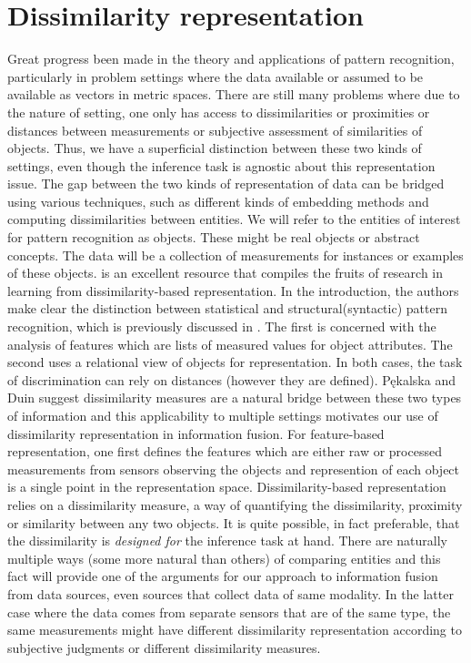 \documentclass[12pt,oneside,final]{thesis}\usepackage[]{graphicx}\usepackage[]{color}
\begin{document}
\section{Dissimilarity representation}
 Great progress been made in the theory and applications of pattern recognition, particularly in problem settings where the data available or assumed to be available as vectors in metric spaces. There are still many problems where due to the nature of setting, one only has access to dissimilarities or  proximities or distances between measurements or subjective assessment  of similarities of objects. Thus, we have a superficial distinction between these two kinds of settings, even though the inference task is agnostic about this representation issue. The gap between the two kinds of representation of data can be bridged using various  techniques, such as different kinds of embedding methods and computing dissimilarities between entities.
We will refer to the entities of interest for pattern recognition as objects. These might be real objects or abstract concepts. The data will be a collection of measurements for instances or examples of these objects.
 \cite{duin2005dissimilarity} is an excellent resource that compiles the fruits of research in learning from  dissimilarity-based representation. In the introduction, the authors make clear the distinction between statistical and structural(syntactic) pattern recognition, which is previously discussed in \cite{NadlerSmith1993}. The first is concerned with the analysis of features which are lists of measured values for object attributes. The second uses a relational view of objects for representation. In both cases,  the task of discrimination  can rely on distances (however they are defined). P\k{e}kalska and Duin  suggest dissimilarity measures  are a natural bridge between these two types of information and this applicability to  multiple settings motivates our use of dissimilarity representation in information fusion. 
For feature-based representation, one first defines the features which are either raw or processed measurements from sensors observing the objects and  represention of each object is a single point in the representation space. Dissimilarity-based representation relies on a dissimilarity measure, a way of quantifying the dissimilarity, proximity or similarity between any two objects. It is quite possible, in fact preferable, that the dissimilarity is \emph{designed for} the inference task at hand. 
There are naturally multiple ways (some more natural than others) of comparing entities and this fact will provide one of the arguments for our approach to information fusion from  data sources, even sources that collect  data of same modality. In  the latter case where the data comes from separate sensors that are of the same type, the same measurements might have different dissimilarity representation according to subjective judgments or different dissimilarity  measures. 
\end{document}
